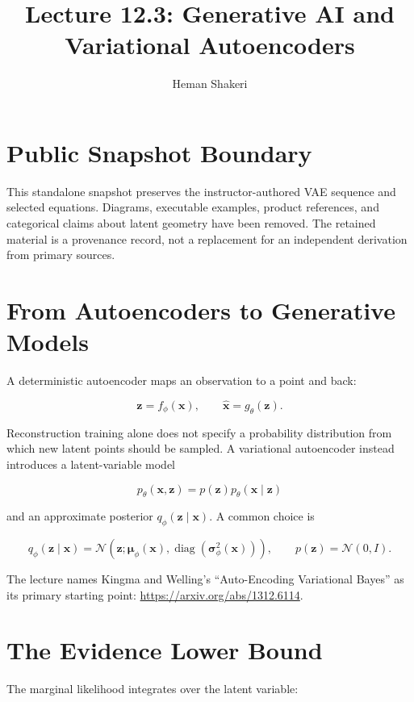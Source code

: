 \documentclass{article}
\title{Lecture 12.3: Generative AI and Variational Autoencoders}
\author{Heman Shakeri}
\date{}
\begin{document}
\maketitle

\section*{Public Snapshot Boundary}

This standalone snapshot preserves the instructor-authored VAE sequence and selected
equations. Diagrams, executable examples, product references, and categorical claims
about latent geometry have been removed. The retained material is a provenance record,
not a replacement for an independent derivation from primary sources.

\section{From Autoencoders to Generative Models}

A deterministic autoencoder maps an observation to a point and back:

\[
\mathbf{z}=f_{\phi}(\mathbf{x}),
\qquad
\hat{\mathbf{x}}=g_{\theta}(\mathbf{z}).
\]

Reconstruction training alone does not specify a probability distribution from which
new latent points should be sampled. A variational autoencoder instead introduces a
latent-variable model

\[
p_{\theta}(\mathbf{x},\mathbf{z})
=p(\mathbf{z})p_{\theta}(\mathbf{x}\mid\mathbf{z})
\]

and an approximate posterior $q_{\phi}(\mathbf{z}\mid\mathbf{x})$. A common choice is

\[
q_{\phi}(\mathbf{z}\mid\mathbf{x})
=\mathcal{N}\!\left(
\mathbf{z};
\boldsymbol{\mu}_{\phi}(\mathbf{x}),
\operatorname{diag}(\boldsymbol{\sigma}_{\phi}^2(\mathbf{x}))
\right),
\qquad
p(\mathbf{z})=\mathcal{N}(0,I).
\]

The lecture names Kingma and Welling's ``Auto-Encoding Variational Bayes'' as its
primary starting point: \url{https://arxiv.org/abs/1312.6114}.


\section{The Evidence Lower Bound}

The marginal likelihood integrates over the latent variable:
\end{document}
